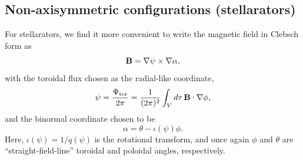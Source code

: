 \documentclass{jpp}
\renewcommand{\vec}[1]{\ensuremath{\mbox{$ {\bf #1} $}}} %
\begin{document}
\subsection{Non-axisymmetric configurations (stellarators)}
For stellarators, we find it more convenient to write the magnetic field in Clebsch form as
\begin{equation}
    \vec{B} = \nabla \psi \times \nabla \alpha,
\end{equation}
with the toroidal flux chosen as the radial-like coordinate, 
\begin{equation}
    \psi = \frac{\Psi_\mathrm{tor}}{2\pi} = \frac{1}{(2\pi)^2}\int_V d\tau\, \vec{B}\cdot\nabla\phi,
\end{equation}
and the binormal coordinate chosen to be
\begin{equation}
    \alpha = \theta - \iota(\psi) \phi.
\end{equation}
Here, $\iota(\psi) = 1/q(\psi)$ is the rotational transform, and once again $\phi$ and $\theta$ are ``straight-field-line'' toroidal and poloidal angles, respectively.

\end{document}
